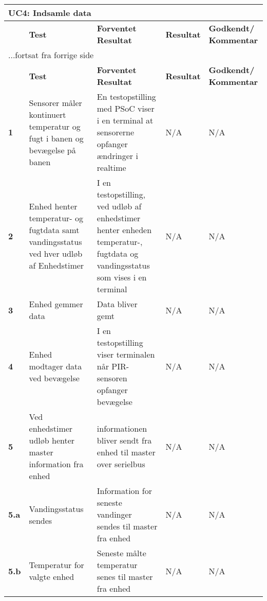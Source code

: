
\begin{center}
\begin{longtable}{|p{}|p{}|p{}|p{}|p{}|} %
\hline
\multicolumn{5}{|l|}{\textbf{UC4: Indsamle data}} \\ \hline
\multicolumn{1}{|c|}{} &
\textbf{Test} &
\textbf{Forventet \newline Resultat} &
\textbf{Resultat} &
\textbf{Godkendt/ \newline Kommentar} \\ \hline 
\endfirsthead

\multicolumn{5}{l}{...fortsat fra forrige side} \\ \hline 
\multicolumn{1}{|c|}{} &
\textbf{Test} &
\textbf{Forventet \newline Resultat} &
\textbf{Resultat} &
\textbf{Godkendt/ \newline Kommentar} \\ \hline 
\endhead

\textbf{1}	&Sensorer måler kontinuert temperatur og fugt i banen og bevægelse på banen
			&En testopstilling med PSoC viser i en terminal at sensorerne opfanger ændringer i realtime
			&N/A
			&N/A \\ \hline 
			
\textbf{2}	&Enhed henter temperatur- og fugtdata samt vandingsstatus ved hver udløb af Enhedstimer
			&I en testopstilling, ved udløb af enhedstimer henter enheden temperatur-, fugtdata og vandingsstatus som vises i en terminal
			&N/A
			&N/A \\ \hline 
			
\textbf{3}	&Enhed gemmer data
			&Data bliver gemt
			&N/A
			&N/A \\ \hline 
			
\textbf{4}	&Enhed modtager data ved bevægelse
			&I en testopstilling viser terminalen når PIR-sensoren opfanger bevægelse
			&N/A
			&N/A \\ \hline 

\textbf{5}	&Ved enhedstimer udløb henter master information fra enhed
			&informationen bliver sendt fra enhed til master over serielbus
			&N/A
			&N/A \\ \hline 
			
\textbf{5.a}	&Vandingsstatus sendes
			&Information for seneste vandinger sendes til master fra enhed
			&N/A
			&N/A \\ \hline 
			
\textbf{5.b}	&Temperatur for valgte enhed
			&Seneste målte temperatur senes til master fra enhed
			&N/A
			&N/A \\ \hline 
			

\end{longtable}
\end{center}
